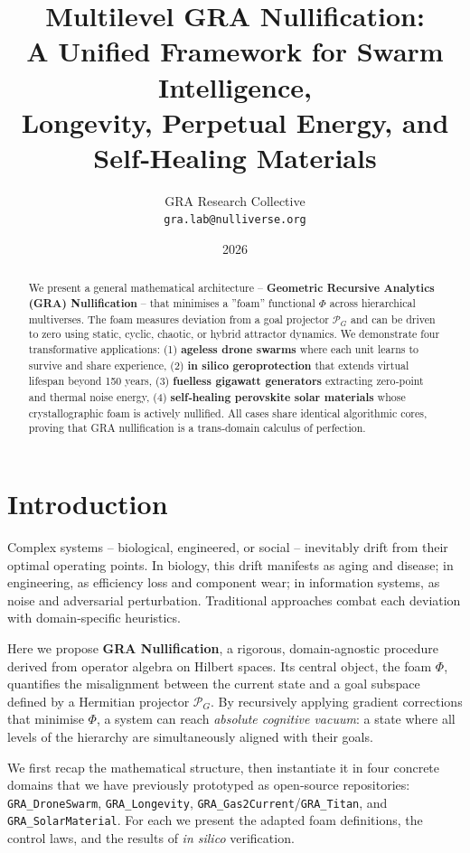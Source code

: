 \documentclass[12pt,a4paper]{article}
\title{\bfseries Multilevel GRA Nullification: \\ A Unified Framework for Swarm Intelligence, \\ Longevity, Perpetual Energy, and Self‑Healing Materials}
\author{GRA Research Collective \\ \small\texttt{gra.lab@nulliverse.org}}
\date{2026}
\begin{document}
\maketitle

\begin{abstract}
We present a general mathematical architecture -- \textbf{Geometric Recursive Analytics (GRA) Nullification} -- that minimises a ''foam'' functional $\Phi$ across hierarchical multiverses. 
The foam measures deviation from a goal projector $\mathcal{P}_G$ and can be driven to zero using static, cyclic, chaotic, or hybrid attractor dynamics.
We demonstrate four transformative applications:
(1) \textbf{ageless drone swarms} where each unit learns to survive and share experience,
(2) \textbf{in silico geroprotection} that extends virtual lifespan beyond 150 years,
(3) \textbf{fuelless gigawatt generators} extracting zero‑point and thermal noise energy,
(4) \textbf{self‑healing perovskite solar materials} whose crystallographic foam is actively nullified.
All cases share identical algorithmic cores, proving that GRA nullification is a trans‑domain calculus of perfection.
\end{abstract}

\section{Introduction}
Complex systems -- biological, engineered, or social -- inevitably drift from their optimal operating points.
In biology, this drift manifests as aging and disease; in engineering, as efficiency loss and component wear; in information systems, as noise and adversarial perturbation.
Traditional approaches combat each deviation with domain‑specific heuristics.

Here we propose \textbf{GRA Nullification}, a rigorous, domain‑agnostic procedure derived from operator algebra on Hilbert spaces.
Its central object, the foam $\Phi$, quantifies the misalignment between the current state and a goal subspace defined by a Hermitian projector $\mathcal{P}_G$.
By recursively applying gradient corrections that minimise $\Phi$, a system can reach \textit{absolute cognitive vacuum}: a state where all levels of the hierarchy are simultaneously aligned with their goals.

We first recap the mathematical structure, then instantiate it in four concrete domains that we have previously prototyped as open‑source repositories:
\texttt{GRA\_DroneSwarm},
\texttt{GRA\_Longevity},
\texttt{GRA\_Gas2Current}/\texttt{GRA\_Titan},
and \texttt{GRA\_SolarMaterial}.
For each we present the adapted foam definitions, the control laws, and the results of \textit{in silico} verification.
\end{document}
